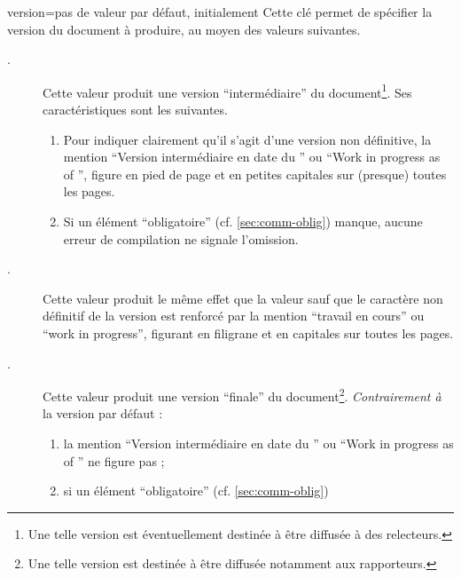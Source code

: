 {
  \begin{docKey}{version}{=\textbar{}\textbar{}\textbar{}}{pas
      de valeur par défaut, initialement }
    Cette clé permet de spécifier la version du document à produire, au moyen
    des valeurs suivantes.
    \begin{description}
    \item[.] Cette valeur produit une version
      \enquote{intermédiaire} du document\footnote{Une telle version est
        éventuellement destinée à être diffusée à des relecteurs.}. Ses
      caractéristiques sont les suivantes.
      \begin{enumerate}
      \item\label{item:inprogress:1} Pour indiquer clairement qu'il s'agit
        d'une version non définitive, la mention \enquote{Version intermédiaire
          en date du } ou \foreignquote{english}{Work in progress as
          of }\selonlangue{}, figure en pied de page et en petites
        capitales sur (presque) toutes les pages.
      \item\label{item:inprogress:2} Si un élément \enquote{obligatoire}
        (cf. \vref{sec:comm-oblig}) manque, aucune erreur de compilation ne
        signale l'omission.
      \end{enumerate}
    \item[.] Cette valeur produit le même effet que la
      valeur  sauf que le caractère non définitif de la
      version est renforcé par la mention \enquote{travail en cours} ou
      \foreignquote{english}{work in progress}\selonlangue{}, figurant en
      filigrane et en capitales sur toutes les pages.
    \item[.] Cette valeur produit une version \enquote{finale}
      du document\footnote{Une telle version est destinée à être diffusée
        notamment aux rapporteurs.}. \emph{Contrairement à} la version par défaut :
      \begin{enumerate}
      \item la mention \enquote{Version intermédiaire en date du }
        ou \foreignquote{english}{Work in progress as of } ne figure
        pas ;
      \item si un élément \enquote{obligatoire} (cf. \vref{sec:comm-oblig})

\end{enumerate}
\end{description}
\end{docKey}}
